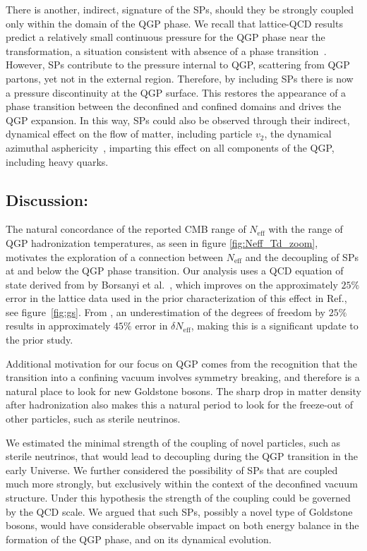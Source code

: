 There is another, indirect, signature of the SPs, should they be strongly coupled only within the domain of the QGP phase. We recall that lattice-QCD results predict a relatively small continuous pressure for the QGP phase near the transformation, a situation consistent with absence of a phase transition~\cite{Borsanyi:2013bia}. However, SPs contribute to the pressure internal to QGP, scattering from QGP partons, yet  not in the external region. Therefore, by including SPs there is now a pressure discontinuity at the QGP surface.  This restores the appearance of a phase transition between the deconfined and confined domains and drives the QGP expansion.  In this way, SPs could also be observed through their indirect, dynamical effect on the flow of matter, including particle $v_2$, the  dynamical azimuthal asphericity~\cite{Ollitrault:1992bk,Voloshin:1994mz},  imparting this effect on all components of the QGP, including heavy quarks.\\[-0.2cm]


\subsection{Discussion:} 
The natural concordance of the reported CMB range of $N_{\text{eff}}$ with the range of QGP hadronization temperatures, as seen in figure \ref{fig:Neff_Td_zoom}, motivates the exploration of a connection between $N_{\text{eff}}$ and the decoupling of SPs at and below  the QGP phase transition.  Our analysis uses a QCD equation of state derived from by Borsanyi et al.~\cite{Borsanyi:2013bia}, which improves on the approximately $25\%$ error in the lattice data used in the prior characterization of this effect in Ref.\cite{Anchordoqui:2011nh}, see figure~\ref{fig:gs}.  From , an underestimation of the degrees of freedom by $25\%$ results in approximately $45\%$ error in $\delta N_{\text{eff}}$, making this is a significant update to the prior study.

 Additional motivation for our focus on QGP comes from the recognition that the transition into a confining vacuum involves symmetry breaking, and therefore is a natural place to look for new Goldstone bosons. The sharp drop in matter density after hadronization also makes this a natural period to look for the freeze-out of other particles, such as sterile neutrinos.

We estimated the minimal strength of the coupling of  novel particles, such as sterile neutrinos, that would lead to decoupling during the QGP transition in the early Universe. We further considered the possibility of SPs that are coupled much more strongly, but exclusively within the context of the deconfined vacuum structure.  Under this hypothesis the strength of the coupling could be governed by the QCD scale. We argued that such SPs, possibly a novel type of Goldstone bosons, would have considerable observable impact on both energy balance in the formation of the QGP phase, and on its dynamical evolution.


